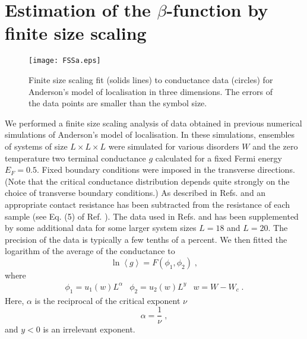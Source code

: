 \documentclass[singlecolumn]{jpsj3}
\begin{document}
\section{Estimation of the $\beta$-function by finite size scaling}\label{sec:fss}

\begin{figure}[htb]
\begin{center}
\texttt{[image: FSSa.eps]}
\caption{Finite size scaling fit (solids lines) to conductance data (circles) for Anderson's model of localisation in three dimensions. The errors of the data points are smaller than the symbol size.}
\label{plot:fss_a}
\end{center}
\end{figure}

We performed a finite size scaling analysis of data obtained in previous
numerical simulations\cite{Slevin01,Slevin03} of Anderson's model of localisation.
In these simulations, ensembles of systems of size $L \times L \times L$ were simulated for various disorders $W$ and the zero temperature two terminal conductance $g$ calculated for a fixed Fermi energy $E_F=0.5$.
Fixed boundary conditions were imposed in the transverse directions.
(Note that the critical conductance distribution depends quite strongly on the choice of transverse boundary conditions.\cite{Slevin00})
As described in Refs.  and  an appropriate contact resistance has been subtracted from the resistance of each sample (see Eq. (5) of Ref. ).
The data used in Refs.  and  has been supplemented by some additional data for some larger system sizes $L=18$ and $L=20$.
The precision of the data is typically a few tenths of a percent.
We then fitted the logarithm of the average of the conductance to
\begin{equation}
  \ln \left\langle g \right\rangle  = F\left( {{\phi _1},{\phi _2}} \right) \;,
\end{equation}
where
\begin{equation}
\begin{array}{*{20}{c}}
{{\phi _1} = {u_1}\left( w \right){L^\alpha }}&{{\phi _2} = {u_2}\left( w \right){L^{ y}}}&{w = W - {W_c}} \;.
\end{array}
\end{equation}
Here, $\alpha$ is the reciprocal of the critical exponent $\nu$
\begin{equation}
  \alpha = \frac{1}{\nu} \;,
\end{equation}
and $y<0$ is an irrelevant exponent.
\end{document}
